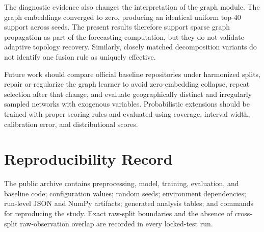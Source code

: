 \documentclass[fleqn,10pt]{wlscirep}
\begin{document}
The diagnostic evidence also changes the interpretation of the graph module.
The graph embeddings converged to zero, producing an identical uniform top-40
support across seeds. The present results therefore support sparse graph
propagation as part of the forecasting computation, but they do not validate
adaptive topology recovery. Similarly, closely matched decomposition variants
do not identify one fusion rule as uniquely effective.

Future work should compare official baseline repositories under harmonized
splits, repair or regularize the graph learner to avoid zero-embedding collapse,
repeat selection after that change, and evaluate geographically distinct and
irregularly sampled networks with exogenous variables. Probabilistic extensions
should be trained with proper scoring rules and evaluated using coverage,
interval width, calibration error, and distributional scores.

\section{Reproducibility Record}
The public archive contains preprocessing, model, training, evaluation, and
baseline code; configuration values; random seeds; environment dependencies;
run-level JSON and NumPy artifacts; generated analysis tables; and commands for
reproducing the study. Exact raw-split boundaries and the absence of
cross-split raw-observation overlap are recorded in every locked-test run.
\end{document}
